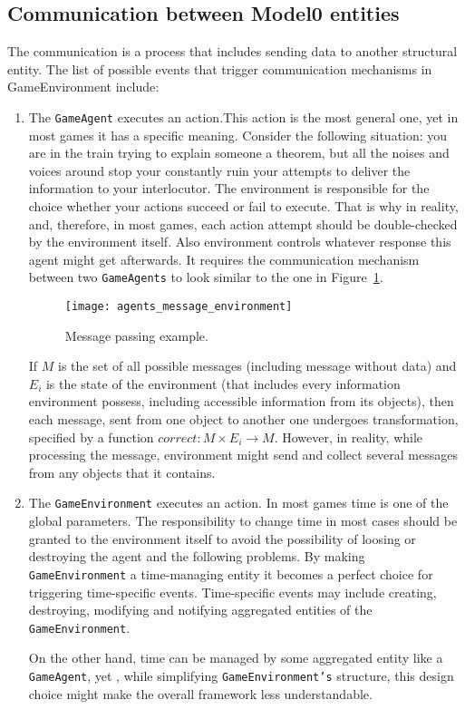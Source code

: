 \subsection{Communication between Model0 entities}
The communication is a process that includes sending data to another structural entity.
The list of possible events that trigger communication mechanisms in GameEnvironment include:
\begin{enumerate}
\item The \texttt{GameAgent} executes an action.This action is the most general one, yet in most games it has a specific meaning. Consider the following situation: you are in the train trying to explain someone a theorem, but all the noises and voices around stop your constantly ruin your attempts to deliver the information to your interlocutor. The environment is responsible for the choice whether your actions succeed or fail to execute. That is why in reality, and, therefore, in most games, each action attempt should be double-checked by the environment itself. Also environment controls whatever response this agent might get afterwards. It requires the communication mechanism between two \texttt{GameAgents} to look similar to the one in Figure~\ref{MessagePass}.
 \begin{figure}[h!]
    \begin{center}
      \texttt{[image: agents\_message\_environment]}
      \caption{Message passing example.}
      \label{MessagePass}
     \end{center}
    \end{figure}
If $M$ is the set of all possible messages (including message without data) and $E_i$ is the state of the environment (that includes every information environment possess, including accessible information from its objects), then each message, sent from one object to another one undergoes transformation, specified by a function \(correct: M\times E_i \rightarrow M\).
However, in reality, while processing the message, environment might send and collect several messages from any objects that it contains.
\item The \texttt{GameEnvironment} executes an action. In most games time is one of the global parameters. The responsibility to change time in most cases should be granted to the environment itself to avoid the possibility of loosing or destroying the agent and the following problems. By making \texttt{GameEnvironment} a time-managing entity it becomes a perfect choice for triggering time-specific events. Time-specific events may include creating, destroying, modifying and notifying aggregated entities of the \texttt{GameEnvironment}.

On the other hand, time can be managed by some aggregated entity like a \texttt{GameAgent}, yet , while simplifying \texttt{GameEnvironment's} structure, this design choice might make the overall framework less understandable.
\end{enumerate}


